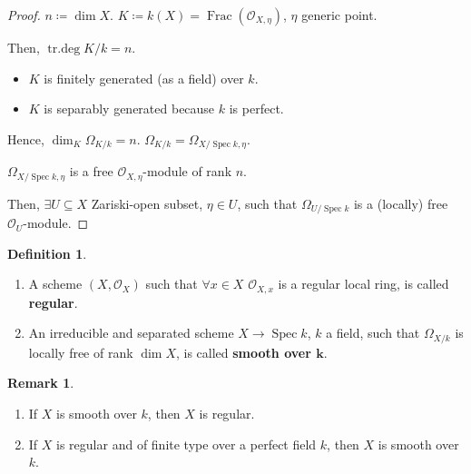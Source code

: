 \documentclass[12pt]{article}
\DeclareMathOperator{\Spec}{Spec}
\DeclareMathOperator{\Frac}{Frac}
\DeclareMathOperator{\trdeg}{tr.deg}
\theoremstyle{definition}
\newtheorem*{definition}{Definition}
\newtheorem*{remark}{Remark}
\begin{document}
\begin{proof}
$n\coloneqq\dim X$. $K\coloneqq k(X)=\Frac(\mathcal{O}_{X,\eta})$, $\eta$ generic point.

Then, $\trdeg K/k=n$.

\begin{itemize}[label=$-$]
\item $K$ is finitely generated (as a field) over $k$.

\item $K$ is separably generated because $k$ is perfect.
\end{itemize}

Hence, $\dim_K\Omega_{K/k}=n$. $\Omega_{K/k}=\Omega_{X/\Spec k,\eta}$.

$\Omega_{X/\Spec k,\eta}$ is a free $\mathcal{O}_{X,\eta}$-module of rank $n$.

Then, $\exists U\subseteq X$ Zariski-open subset, $\eta\in U$, such that $\Omega_{U/\Spec k}$ is a (locally) free $\mathcal{O}_U$-module.
\end{proof}

\begin{definition}
\begin{enumerate}[label=\arabic*)]
\item A scheme $(X,\mathcal{O}_X)$ such that $\forall x\in X$ $\mathcal{O}_{X,x}$ is a regular local ring, is called \textbf{regular}.

\item An irreducible and separated scheme $X\rightarrow\Spec k$, $k$ a field, such that $\Omega_{X/k}$ is locally free of rank $\dim X$, is called \textbf{smooth over $\boldsymbol{k}$}.
\end{enumerate}
\end{definition}

\begin{remark}
\begin{enumerate}[label=\arabic*)]
\item If $X$ is smooth over $k$, then $X$ is regular.

\item If $X$ is regular and of finite type over a perfect field $k$, then $X$ is smooth over $k$.
\end{enumerate}
\end{remark}
\end{document}

